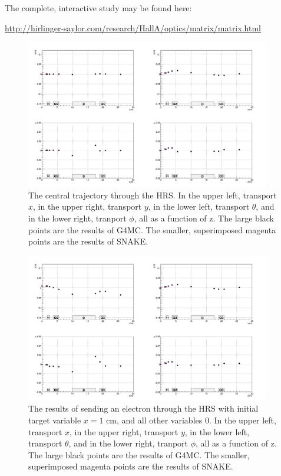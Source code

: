 \documentclass[11pt]{amsart}
\begin{document}
The complete, interactive study may be found here:

\url{http://hirlinger-saylor.com/research/HallA/optics/matrix/matrix.html}


\FloatBarrier
\begin{figure}
\begin{center}
\includegraphics[width=0.95\textwidth]{plots/pres_matrix_x_3.png}
\end{center}
\caption{The central trajectory through the HRS. In the upper left, transport $x$, in the upper right, transport $y$, in the lower left, transport $\theta$, and in the lower right, tranport $\phi$, all as a function of z. The large black points are the results of G4MC. The smaller, superimposed magenta points are the results of SNAKE.}
\end{figure}

\begin{figure}
\begin{center}
\includegraphics[width=0.95\textwidth]{plots/pres_matrix_x_4.png}
\end{center}
\caption{The results of sending an electron through the HRS with initial target variable $x=1\text{ cm}$, and all other variables 0. In the upper left, transport $x$, in the upper right, transport $y$, in the lower left, transport $\theta$, and in the lower right, tranport $\phi$, all as a function of z. The large black points are the results of G4MC. The smaller, superimposed magenta points are the results of SNAKE.}
\end{figure}
\end{document}

